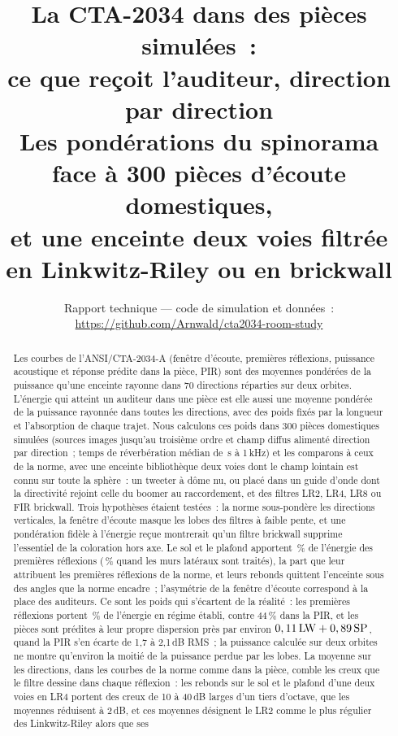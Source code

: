 \documentclass[11pt,a4paper]{article}
\title{La CTA-2034 dans des pièces simulées~:\\ce que reçoit l'auditeur, direction par direction\\[4pt]
\large Les pondérations du spinorama face à 300 pièces d'écoute domestiques,\\et une enceinte deux voies
filtrée en Linkwitz-Riley ou en brickwall}
\author{}
\date{Rapport technique --- code de simulation et données~:\\
\url{https://github.com/Arnwald/cta2034-room-study}}
\begin{document}
\maketitle

\begin{abstract}
Les courbes de l'ANSI/CTA-2034-A (fenêtre d'écoute, premières réflexions, puissance acoustique et
réponse prédite dans la pièce, PIR) sont des moyennes pondérées de la puissance qu'une enceinte rayonne
dans 70 directions réparties sur deux orbites. L'énergie qui atteint un auditeur dans une pièce est
elle aussi une moyenne pondérée de la puissance rayonnée dans toutes les directions, avec des poids
fixés par la longueur et l'absorption de chaque trajet. Nous calculons ces poids dans 300 pièces
domestiques simulées (sources images jusqu'au troisième ordre et champ diffus alimenté direction par
direction~; temps de réverbération médian de \nrtMedian\,s à 1\,kHz) et les comparons à ceux de la norme,
avec une enceinte bibliothèque deux voies dont le champ lointain est connu sur toute la sphère~: un
tweeter à dôme nu, ou placé dans un guide d'onde dont la directivité rejoint celle du boomer au
raccordement, et des filtres LR2, LR4, LR8 ou FIR brickwall. Trois hypothèses étaient testées~: la
norme sous-pondère les directions verticales, la fenêtre d'écoute masque les lobes des filtres à faible
pente, et une pondération fidèle à l'énergie reçue montrerait qu'un filtre brickwall supprime
l'essentiel de la coloration hors axe. Le sol et le plafond apportent \nvertShare\,\% de l'énergie des
premières réflexions (\nvertTreated\,\% quand les murs latéraux sont traités), la part que leur
attribuent les premières réflexions de la norme, et leurs rebonds quittent l'enceinte sous des angles
que la norme encadre~; l'asymétrie de la fenêtre d'écoute correspond à la place des auditeurs. Ce sont
les poids qui s'écartent de la réalité~: les premières réflexions portent \nfirstShare\,\% de l'énergie
en régime établi, contre 44\,\% dans la PIR, et les pièces sont prédites à leur propre dispersion près
par environ $0,11\,\mathrm{LW} + 0,89\,\mathrm{SP}$, quand la PIR s'en écarte de 1,7 à 2,1\,dB RMS~; la
puissance calculée sur deux orbites ne montre qu'environ la moitié de la puissance perdue par les
lobes. La moyenne sur les directions, dans les courbes de la norme comme dans la pièce, comble les
creux que le filtre dessine dans chaque réflexion~: les rebonds sur le sol et le plafond d'une deux
voies en LR4 portent des creux de 10 à 40\,dB larges d'un tiers d'octave, que les moyennes réduisent à
2\,dB, et ces moyennes désignent le LR2 comme le plus régulier des Linkwitz-Riley alors que ses

\end{abstract}
\end{document}
